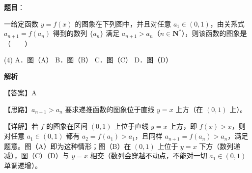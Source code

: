 \begin{answer}

\textbf{题目}：

一给定函数 $y = f(x)$ 的图象在下列图中，并且对任意 $a_1 \in (0, 1)$，由关系式 $a_{n+1} = f(a_n)$ 得到的数列 $\{a_n\}$ 满足 $a_{n+1} > a_n$（$n \in \mathbf{N}^*$），则该函数的图象是\mbox{（　　）}
\nopagebreak[4]
\begin{center}\end{center}
\nopagebreak[4]
\begin{gkopts}(4)
\task A．图（A）
\task B．图（B）
\task C．图（C）
\task D．图（D）
\end{gkopts}

\textbf{解析}

【答案】A

【思路】$a_{n+1} > a_n$ 要求递推函数的图象位于直线 $y = x$ 上方（在 $(0,1)$ 上）。

【详解】若 $f$ 的图象在区间 $(0,1)$ 上位于直线 $y = x$ 上方，即 $f(x) > x$，则对任意 $a_1 \in (0,1)$ 都有 $a_2 = f(a_1) > a_1$，且同样 $a_{n+1} = f(a_n) > a_n$，满足题意。图（A）即为这种情形；图（B）在 $(0,1)$ 上位于 $y = x$ 下方（数列递减），图（C）（D）与 $y = x$ 相交（数列会穿越不动点，不能对一切 $a_1 \in (0,1)$ 单调递增）。


\end{answer}

